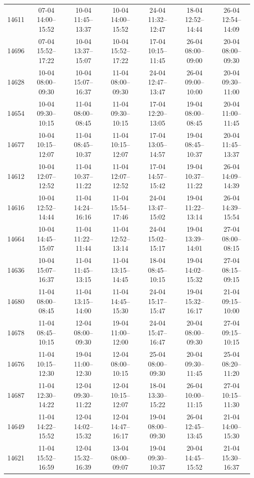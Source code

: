\begin{table}[htbp]
\begin{tabular}{|r|c|c|c|c|c|c|}
14611 & 07-04 14:00--15:52 & 10-04 11:45--13:37 & 10-04 14:00--15:52 & 24-04 11:32--12:47 & 18-04 12:52--14:44 & 26-04 12:54--14:09 \\ 
14696 & 07-04 15:52--17:22 & 10-04 13:37--15:07 & 10-04 15:52--17:22 & 17-04 10:15--11:45 & 26-04 08:00--09:00 & 20-04 08:00--09:30 \\ 
14628 & 10-04 08:00--09:30 & 10-04 15:07--16:37 & 11-04 08:00--09:30 & 24-04 12:47--13:47 & 26-04 09:00--10:00 & 20-04 09:30--11:00 \\ 
14654 & 10-04 09:30--10:15 & 11-04 08:00--08:45 & 11-04 09:30--10:15 & 17-04 12:20--13:05 & 19-04 08:00--08:45 & 20-04 11:00--11:45 \\ 
14677 & 10-04 10:15--12:07 & 11-04 08:45--10:37 & 11-04 10:15--12:07 & 17-04 13:05--14:57 & 19-04 08:45--10:37 & 20-04 11:45--13:37 \\ 
14612 & 10-04 12:07--12:52 & 11-04 10:37--11:22 & 11-04 12:07--12:52 & 17-04 14:57--15:42 & 19-04 10:37--11:22 & 26-04 14:09--14:39 \\ 
14616 & 10-04 12:52--14:44 & 11-04 14:24--16:16 & 11-04 15:54--17:46 & 24-04 13:47--15:02 & 19-04 11:22--13:14 & 26-04 14:39--15:54 \\ 
14664 & 10-04 14:45--15:07 & 11-04 11:22--11:44 & 11-04 12:52--13:14 & 24-04 15:02--15:17 & 19-04 13:39--14:01 & 27-04 08:00--08:15 \\ 
14636 & 10-04 15:07--16:37 & 11-04 11:45--13:15 & 11-04 13:15--14:45 & 18-04 08:45--10:15 & 19-04 14:02--15:32 & 27-04 08:15--09:15 \\ 
14680 & 11-04 08:00--08:45 & 11-04 13:15--14:00 & 11-04 14:45--15:30 & 24-04 15:17--15:47 & 19-04 15:32--16:17 & 21-04 09:15--10:00 \\ 
14678 & 11-04 08:45--10:15 & 12-04 08:00--09:30 & 19-04 11:00--12:00 & 24-04 15:47--16:47 & 20-04 08:00--09:30 & 27-04 09:15--10:15 \\ 
14676 & 11-04 10:15--12:30 & 19-04 11:00--12:30 & 12-04 08:00--10:15 & 25-04 08:00--09:30 & 20-04 09:30--11:45 & 25-04 08:20--11:20 \\ 
14687 & 11-04 12:30--14:22 & 12-04 09:30--11:22 & 12-04 10:15--12:07 & 18-04 13:30--15:22 & 26-04 10:00--11:15 & 27-04 10:15--11:30 \\ 
14649 & 11-04 14:22--15:52 & 12-04 14:02--15:32 & 12-04 14:47--16:17 & 19-04 08:00--09:30 & 26-04 12:45--13:45 & 21-04 14:00--15:30 \\ 
14621 & 11-04 15:52--16:59 & 12-04 15:32--16:39 & 13-04 08:00--09:07 & 19-04 09:30--10:37 & 20-04 14:45--15:52 & 21-04 15:30--16:37 \\ 

\end{tabular}
\end{table}
